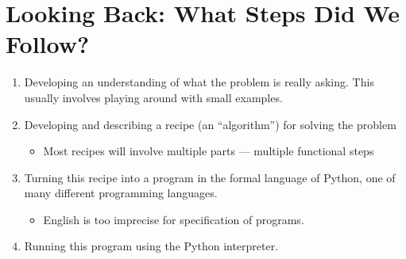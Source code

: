 \documentclass[letterpaper,10pt,english]{sphinxmanual}
\begin{document}
\section{Looking Back: What Steps Did We Follow?}
\label{\detokenize{lecture_notes/lec01_intro:looking-back-what-steps-did-we-follow}}\begin{enumerate}
\item {} 
Developing an understanding of what the problem is really asking.
This usually involves playing around with small examples.

\item {} 
Developing and describing a recipe (an “algorithm”) for solving the
problem
\begin{itemize}
\item {} 
Most recipes will involve multiple parts — multiple functional
steps

\end{itemize}

\item {} 
Turning this recipe into a program in the formal language of Python,
one of many different programming languages.
\begin{itemize}
\item {} 
English is too imprecise for specification of programs.

\end{itemize}

\item {} 
Running this program using the Python interpreter.

\end{enumerate}
\end{document}
